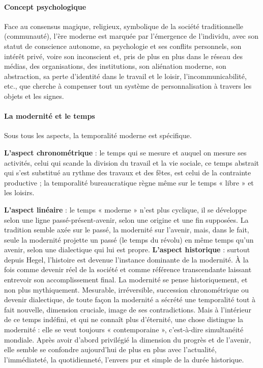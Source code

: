 \paragraph{Concept psychologique}
Face au consensus magique, religieux, symbolique de la société traditionnelle (communauté), l'ère moderne est marquée par l'émergence de l'individu, avec son statut de conscience autonome, sa psychologie et ses conflits personnels, son intérêt privé, voire son inconscient et, pris de plus en plus dans le réseau des médias, des organisations, des institutions, son aliénation moderne, son abstraction, sa perte d'identité dans le travail et le loisir, l'incommunicabilité, etc., que cherche à compenser tout un système de personnalisation à travers les objets et les signes.
\paragraph{La modernité et le temps}
Sous tous les aspects, la temporalité moderne est spécifique.

\textbf{L'aspect chronométrique }: le temps qui se mesure et auquel on mesure ses activités, celui qui scande la division du travail et la vie sociale, ce temps abstrait qui s'est substitué au rythme des travaux et des fêtes, est celui de la contrainte productive ; la temporalité bureaucratique règne même sur le temps « libre » et les loisirs.
 
\textbf{L'aspect linéaire} : le temps « moderne » n'est plus cyclique, il se développe selon une ligne passé-présent-avenir, selon une origine et une fin supposées. La tradition semble axée sur le passé, la modernité sur l'avenir, mais, dans le fait, seule la modernité projette un passé (le temps du révolu) en même temps qu'un avenir, selon une dialectique qui lui est propre.
\textbf{L'aspect historique} : surtout depuis Hegel, l'histoire est devenue l'instance dominante de la modernité. À la fois comme devenir réel de la société et comme référence transcendante laissant entrevoir son accomplissement final. La modernité se pense historiquement, et non plus mythiquement.
Mesurable, irréversible, succession chronométrique ou devenir dialectique, de toute façon la modernité a sécrété une temporalité tout à fait nouvelle, dimension cruciale, image de ses contradictions. Mais à l'intérieur de ce temps indéfini, et qui ne connaît plus d'éternité, une chose distingue la modernité : elle se veut toujours « contemporaine », c'est-à-dire simultanéité mondiale. Après avoir d'abord privilégié la dimension du progrès et de l'avenir, elle semble se confondre aujourd'hui de plus en plus avec l'actualité, l'immédiateté, la quotidienneté, l'envers pur et simple de la durée historique.

